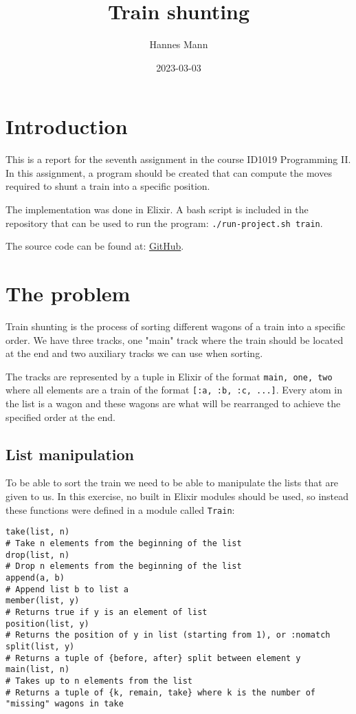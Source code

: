 \documentclass[a4paper,11pt]{article}
\begin{document}
\title{
    \textbf{Train shunting}
}
\author{Hannes Mann}
\date{2023-03-03}

\maketitle

\section*{Introduction}

This is a report for the seventh assignment in the course ID1019 Programming II.
In this assignment, a program should be created that can compute the moves required to shunt a train into a specific position.

The implementation was done in Elixir. A bash script is included in the repository that can be used to run the program: \texttt{./run-project.sh train}.

The source code can be found at: \href{https://github.com/hannesmann/ID1019/tree/main/src/train}{GitHub}.

\section*{The problem}

Train shunting is the process of sorting different wagons of a train into a specific order.
We have three tracks, one "main" track where the train should be located at the end and two auxiliary tracks we can use when sorting.

The tracks are represented by a tuple in Elixir of the format \texttt{{main, one, two}} where all elements are a train of the format \texttt{[:a, :b, :c, ...]}.
Every atom in the list is a wagon and these wagons are what will be rearranged to achieve the specified order at the end.

\subsection*{List manipulation}

To be able to sort the train we need to be able to manipulate the lists that are given to us.
In this exercise, no built in Elixir modules should be used, so instead these functions were defined in a module called \texttt{Train}:

\begin{verbatim}
take(list, n)
# Take n elements from the beginning of the list
drop(list, n)
# Drop n elements from the beginning of the list
append(a, b)
# Append list b to list a
member(list, y)
# Returns true if y is an element of list
position(list, y)
# Returns the position of y in list (starting from 1), or :nomatch
split(list, y)
# Returns a tuple of {before, after} split between element y
main(list, n)
# Takes up to n elements from the list
# Returns a tuple of {k, remain, take} where k is the number of "missing" wagons in take
\end{verbatim}
\end{document}
